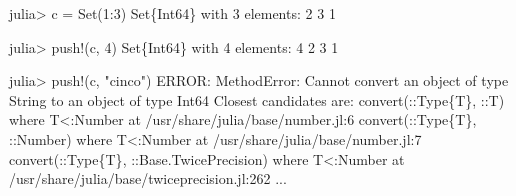 \documentclass[
  letterpaper,
  DIV=11,
  numbers=noendperiod]{scrreprt}
\newenvironment{Shaded}{\begin{snugshade}}{\end{snugshade}}
\newcommand{\DataTypeTok}[1]{\textcolor[rgb]{0.68,0.00,0.00}{#1}}
\newcommand{\FloatTok}[1]{\textcolor[rgb]{0.68,0.00,0.00}{#1}}
\newcommand{\FunctionTok}[1]{\textcolor[rgb]{0.28,0.35,0.67}{#1}}
\newcommand{\KeywordTok}[1]{\textcolor[rgb]{0.00,0.23,0.31}{#1}}
\newcommand{\NormalTok}[1]{\textcolor[rgb]{0.00,0.23,0.31}{#1}}
\newcommand{\OperatorTok}[1]{\textcolor[rgb]{0.37,0.37,0.37}{#1}}
\newcommand{\SpecialStringTok}[1]{\textcolor[rgb]{0.13,0.47,0.30}{#1}}
\newcommand{\StringTok}[1]{\textcolor[rgb]{0.13,0.47,0.30}{#1}}
\begin{document}
\begin{Shaded}
\begin{Highlighting}[]
\NormalTok{julia}\OperatorTok{\textgreater{}}\NormalTok{ c }\OperatorTok{=} \FunctionTok{Set}\NormalTok{(}\FloatTok{1}\OperatorTok{:}\FloatTok{3}\NormalTok{)}
\DataTypeTok{Set}\NormalTok{\{}\DataTypeTok{Int64}\NormalTok{\} with }\FloatTok{3}\NormalTok{ elements}\OperatorTok{:}
  \FloatTok{2}
  \FloatTok{3}
  \FloatTok{1}

\NormalTok{julia}\OperatorTok{\textgreater{}} \FunctionTok{push!}\NormalTok{(c, }\FloatTok{4}\NormalTok{)}
\DataTypeTok{Set}\NormalTok{\{}\DataTypeTok{Int64}\NormalTok{\} with }\FloatTok{4}\NormalTok{ elements}\OperatorTok{:}
  \FloatTok{4}
  \FloatTok{2}
  \FloatTok{3}
  \FloatTok{1}

\NormalTok{julia}\OperatorTok{\textgreater{}} \FunctionTok{push!}\NormalTok{(c, }\StringTok{"cinco"}\NormalTok{)}
\NormalTok{ERROR}\OperatorTok{:} \DataTypeTok{MethodError}\OperatorTok{:}\NormalTok{ Cannot }\SpecialStringTok{\textasciigrave{}convert\textasciigrave{}}\NormalTok{ an object of }\KeywordTok{type} \DataTypeTok{String}\NormalTok{ to an object of }\KeywordTok{type} \DataTypeTok{Int64}
\NormalTok{Closest candidates are}\OperatorTok{:}
  \FunctionTok{convert}\NormalTok{(}\OperatorTok{::}\DataTypeTok{Type\{T\}}\NormalTok{, }\OperatorTok{::}\DataTypeTok{T}\NormalTok{) }\KeywordTok{where}\NormalTok{ T}\OperatorTok{\textless{}:}\DataTypeTok{Number }\NormalTok{at }\OperatorTok{/}\NormalTok{usr}\OperatorTok{/}\NormalTok{share}\OperatorTok{/}\NormalTok{julia}\OperatorTok{/}\NormalTok{base}\OperatorTok{/}\NormalTok{number.jl}\OperatorTok{:}\FloatTok{6}
  \FunctionTok{convert}\NormalTok{(}\OperatorTok{::}\DataTypeTok{Type\{T\}}\NormalTok{, }\OperatorTok{::}\DataTypeTok{Number}\NormalTok{) }\KeywordTok{where}\NormalTok{ T}\OperatorTok{\textless{}:}\DataTypeTok{Number }\NormalTok{at }\OperatorTok{/}\NormalTok{usr}\OperatorTok{/}\NormalTok{share}\OperatorTok{/}\NormalTok{julia}\OperatorTok{/}\NormalTok{base}\OperatorTok{/}\NormalTok{number.jl}\OperatorTok{:}\FloatTok{7}
  \FunctionTok{convert}\NormalTok{(}\OperatorTok{::}\DataTypeTok{Type\{T\}}\NormalTok{, }\OperatorTok{::}\DataTypeTok{Base.TwicePrecision}\NormalTok{) }\KeywordTok{where}\NormalTok{ T}\OperatorTok{\textless{}:}\DataTypeTok{Number }\NormalTok{at }\OperatorTok{/}\NormalTok{usr}\OperatorTok{/}\NormalTok{share}\OperatorTok{/}\NormalTok{julia}\OperatorTok{/}\NormalTok{base}\OperatorTok{/}\NormalTok{twiceprecision.jl}\OperatorTok{:}\FloatTok{262}
  \OperatorTok{...}
\end{Highlighting}
\end{Shaded}
\end{document}
